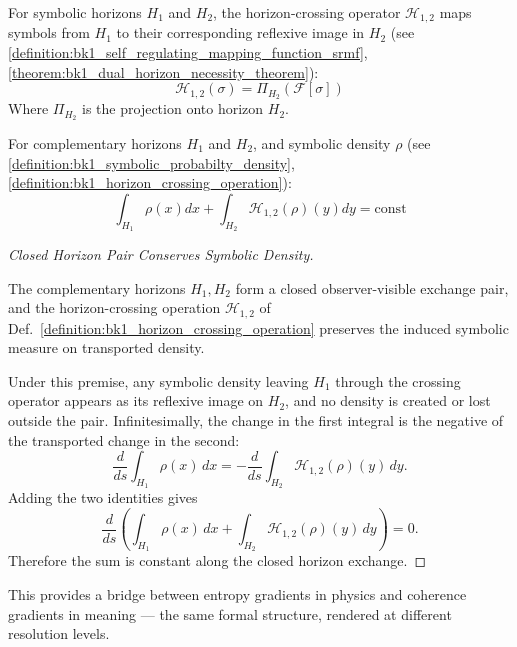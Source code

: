 \begin{definition}
\label{definition:bk1_horizon_crossing_operation}
For symbolic horizons $H_1$ and $H_2$, the horizon-crossing operator $\mathcal{H}_{1,2}$ maps symbols from $H_1$ to their corresponding reflexive image in $H_2$ (see \ref{definition:bk1_self_regulating_mapping_function_srmf}, \ref{theorem:bk1_dual_horizon_necessity_theorem}):
\[
\mathcal{H}_{1,2}(\sigma) = \Pi_{H_2}(\mathcal{F}[\sigma])
\]
Where $\Pi_{H_2}$ is the projection onto horizon $H_2$.
\end{definition}

\begin{lemma}
\label{lemma:bk1_horizon_crossing_conservation}
For complementary horizons $H_1$ and $H_2$, and symbolic density $\rho$ (see \ref{definition:bk1_symbolic_probabilty_density}, \ref{definition:bk1_horizon_crossing_operation}):
\[
\int_{H_1} \rho(x) dx + \int_{H_2} \mathcal{H}_{1,2}(\rho)(y) dy = \text{const}
\]
\end{lemma}
\begin{proof}[Closed Horizon Pair Conserves Symbolic Density]
\label{proof:bk1_horizon_crossing_conservation}
\leavevmode

\begin{assumption}
The complementary horizons \(H_1,H_2\) form a closed observer-visible exchange
pair, and the horizon-crossing operation
\(\mathcal{H}_{1,2}\) of Def.~\ref{definition:bk1_horizon_crossing_operation}
preserves the induced symbolic measure on transported density.
\end{assumption}

Under this premise, any symbolic density leaving \(H_1\) through the crossing
operator appears as its reflexive image on \(H_2\), and no density is created or
lost outside the pair. Infinitesimally, the change in the first integral is the
negative of the transported change in the second:
\[
\frac{d}{ds}\int_{H_1}\rho(x)\,dx
=
-\frac{d}{ds}\int_{H_2}\mathcal{H}_{1,2}(\rho)(y)\,dy .
\]
Adding the two identities gives
\[
\frac{d}{ds}\left(
\int_{H_1}\rho(x)\,dx+
\int_{H_2}\mathcal{H}_{1,2}(\rho)(y)\,dy
\right)=0.
\]
Therefore the sum is constant along the closed horizon exchange.
\end{proof}

\begin{remark}
This provides a bridge between entropy gradients in physics and coherence gradients in meaning — the same formal structure, rendered at different resolution levels.
\end{remark}

